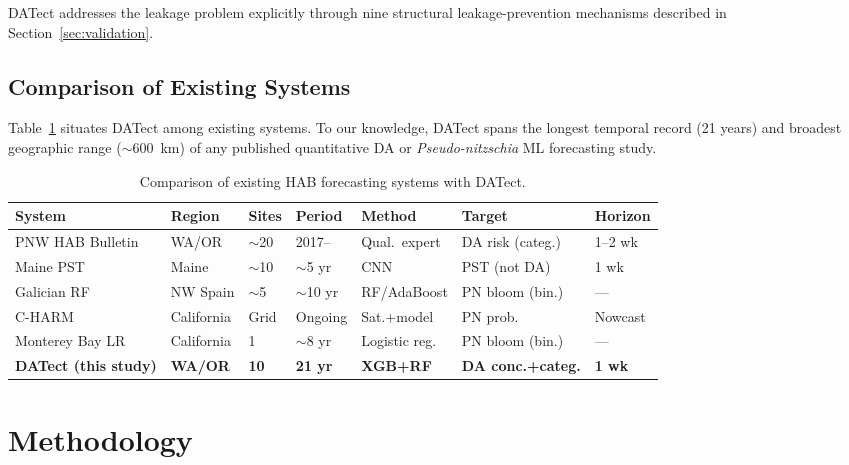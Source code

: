 \documentclass[toxins,article,submit,moreauthors]{Definitions/mdpi}
\begin{document}
DATect addresses the leakage problem explicitly through nine structural leakage-prevention mechanisms described in Section~\ref{sec:validation}.

\subsection{Comparison of Existing Systems}
\label{sec:rw-comparison}

Table~\ref{tab:system-comparison} situates DATect among existing systems. To our knowledge, DATect spans the longest temporal record (21 years) and broadest geographic range ($\sim$\SI{600}{\kilo\meter}) of any published quantitative DA or \textit{Pseudo-nitzschia} ML forecasting study.

\begin{table}[H]
\caption{Comparison of existing HAB forecasting systems with DATect.}
\label{tab:system-comparison}
\centering\scriptsize
\begin{tabular*}{\linewidth}{@{\extracolsep{\fill}}lllllll}
\toprule
\textbf{System} & \textbf{Region} & \textbf{Sites} & \textbf{Period} & \textbf{Method} & \textbf{Target} & \textbf{Horizon} \\
\midrule
PNW HAB Bulletin \cite{McCabe2023} & WA/OR & $\sim$20 & 2017-- & Qual.\ expert & DA risk (categ.) & 1--2 wk \\
\addlinespace
Maine PST \cite{Grasso2019} & Maine & $\sim$10 & $\sim$5 yr & CNN & PST (not DA) & 1 wk \\
\addlinespace
Galician RF \cite{Alaez2021} & NW Spain & $\sim$5 & $\sim$10 yr & RF/AdaBoost & PN bloom (bin.) & --- \\
\addlinespace
C-HARM \cite{Anderson2016} & California & Grid & Ongoing & Sat.+model & PN prob. & Nowcast \\
\addlinespace
Monterey Bay LR \cite{Lane2009} & California & 1 & $\sim$8 yr & Logistic reg. & PN bloom (bin.) & --- \\
\addlinespace
\textbf{DATect (this study)} & \textbf{WA/OR} & \textbf{10} & \textbf{21 yr} & \textbf{XGB+RF} & \textbf{DA conc.+categ.} & \textbf{1 wk} \\
\bottomrule
\end{tabular*}
\end{table}


\section{Methodology}
\label{sec:methodology}
\end{document}
